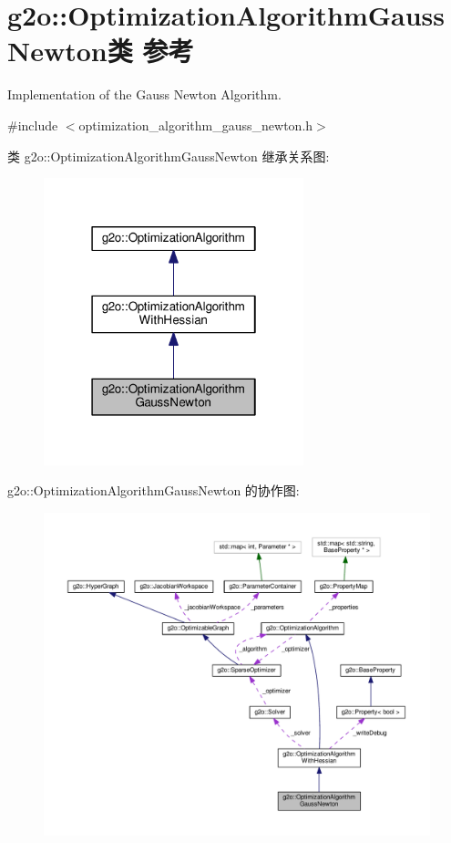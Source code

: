 \hypertarget{classg2o_1_1OptimizationAlgorithmGaussNewton}{\section{g2o\-:\-:Optimization\-Algorithm\-Gauss\-Newton类 参考}
\label{classg2o_1_1OptimizationAlgorithmGaussNewton}
}


Implementation of the Gauss Newton Algorithm.  




{\ttfamily \#include $<$optimization\-\_\-algorithm\-\_\-gauss\-\_\-newton.\-h$>$}



类 g2o\-:\-:Optimization\-Algorithm\-Gauss\-Newton 继承关系图\-:
\nopagebreak
\begin{figure}[H]
\begin{center}
\leavevmode
\includegraphics[width=214pt]{classg2o_1_1OptimizationAlgorithmGaussNewton__inherit__graph}
\end{center}
\end{figure}


g2o\-:\-:Optimization\-Algorithm\-Gauss\-Newton 的协作图\-:
\nopagebreak
\begin{figure}[H]
\begin{center}
\leavevmode
\includegraphics[width=350pt]{classg2o_1_1OptimizationAlgorithmGaussNewton__coll__graph}
\end{center}
\end{figure}
